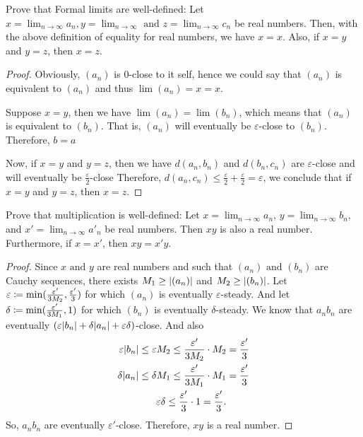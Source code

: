 \begin{exercise}
  Prove that Formal limits are well-defined: Let $x = \lim_{n\to \infty}a_n, y = \lim_{n\to \infty} \text{\ and\ } z = \lim_{n \to \infty}c_n$
  be real numbers. Then, with the above definition of equality for real numbers, we have $x = x$. Also, if $x = y$ and $y = z$, then $x = z$.
\end{exercise}

\begin{proof}
  Obviously, $(a_n)$ is 0-close to it self, hence we could say that $(a_n)$ is equivalent to $(a_n)$ and thus $\lim (a_n) = x = x$. \par
  Suppose $x = y$, then we have $\lim (a_n) = \lim (b_n)$, which means that $(a_n)$ is equivalent to $(b_n)$. 
  That is, $(a_n)$ will eventually be $\varepsilon$-close to $(b_n)$. Therefore, $b = a$ \par
  Now, if $x = y$ and $y = z$, then we have $d(a_n, b_n)$ and $d(b_n, c_n)$ are $\varepsilon$-close and will eventually be $\frac{\varepsilon}{2}$-close
  Therefore, $d(a_n, c_n) \leq \frac{\varepsilon}{2} + \frac{\varepsilon}{2} = \varepsilon$, we conclude that if $x = y$ and $y = z$, then $x = z$.
\end{proof}



\begin{exercise}
  Prove that multiplication is well-defined: Let $x = \lim_{n \to \infty}a_n$, $y = \lim_{n \to \infty} b_n$, and $x' = \lim_{n \to \infty} a'_n$ be real numbers.
  Then $xy$ is also a real number. Furthermore, if $x = x'$, then $xy = x'y$.
\end{exercise}
\begin{proof}
  Since $x \text{\ and\ } y$ are real numbers and such that $(a_n) \text{\ and\ } (b_n)$ are Cauchy sequences, there exists $M_1 \geq \abs{(a_n)}$ and $M_2 \geq \abs{(b_n)}$.
Let $\varepsilon \coloneqq \min (\frac{\varepsilon'}{3M_2}, \frac{\varepsilon'}{3})$ for which $(a_n)$ is eventually $\varepsilon$-steady. And let
$\delta \coloneqq \min (\frac{\varepsilon'}{3M_1}, 1)$ for which $(b_n)$ is eventually $\delta$-steady.
We know that $a_nb_n$ are eventually $(\varepsilon \abs{b_n} + \delta \abs{a_n} + \varepsilon \delta)$-close. And also
\begin{align*}
\varepsilon \abs{b_n} \leq \varepsilon M_2 \leq \frac{\varepsilon'}{3M_2} \cdot M_2 &= \frac{\varepsilon'}{3} \\
\delta \abs{a_n} \leq \delta M_1 \leq \frac{\varepsilon'}{3M_1} \cdot M_1 &= \frac{\varepsilon'}{3} \\
\varepsilon \delta \leq \frac{\varepsilon'}{3} \cdot 1 = \frac{\varepsilon'}{3}
.\end{align*}
So, $a_nb_n$ are eventually $\varepsilon'$-close. Therefore, $xy$ is a real number. \par
\end{proof}

